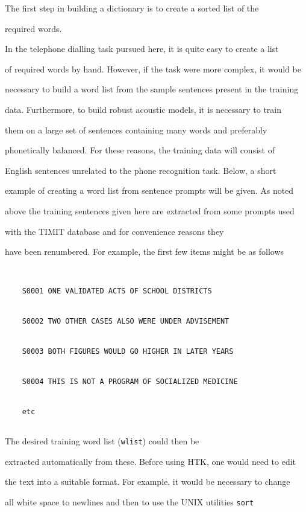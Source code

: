 The first step in building a dictionary is to create a sorted list of the


required words. 


In the telephone dialling task pursued here, it is quite easy to create a list


of required words by hand. However, if the task were more complex, it would be


necessary to build a word list from the sample sentences present in the training


data. Furthermore, to build robust acoustic models, it is necessary to train


them on a large set of sentences containing many words and preferably


phonetically balanced. For these reasons, the training data will consist of


English sentences unrelated to the phone recognition task. Below, a short


example of creating a word list from sentence prompts will be given. As noted


above the training sentences given here are extracted from some prompts used


with the TIMIT database and for convenience reasons they 


have been renumbered. For example, the first few items might be as follows


\vspace{1cm}


\begin{verbatim}


    S0001 ONE VALIDATED ACTS OF SCHOOL DISTRICTS


    S0002 TWO OTHER CASES ALSO WERE UNDER ADVISEMENT


    S0003 BOTH FIGURES WOULD GO HIGHER IN LATER YEARS


    S0004 THIS IS NOT A PROGRAM OF SOCIALIZED MEDICINE


    etc


\end{verbatim}


The desired training word list (\texttt{wlist}) could then be


extracted automatically from these.  Before using HTK, one would need to edit


the text into a suitable format.  For example, it would be necessary to change


all white space to newlines and then to use the UNIX utilities \texttt{sort}


